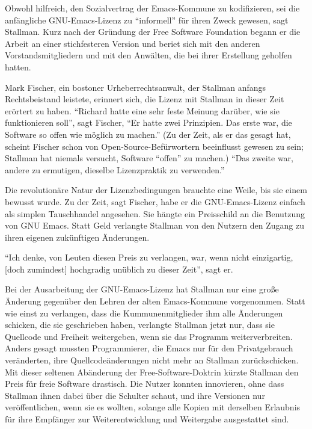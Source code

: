 Obwohl hilfreich, den Sozialvertrag der Emacs-Kommune zu kodifizieren, sei die anfängliche GNU-Emacs-Lizenz zu "`informell"' für ihren Zweck gewesen, sagt Stallman. Kurz nach der Gründung der Free Software Foundation begann er die Arbeit an einer stichfesteren Version und beriet sich mit den anderen Vorstandsmitgliedern und mit den Anwälten, die bei ihrer Erstellung geholfen hatten.

Mark Fischer, ein bostoner Urheberrechtsanwalt, der Stallman anfangs Rechtsbeistand leistete, erinnert sich, die Lizenz mit Stallman in dieser Zeit erörtert zu haben. "`Richard hatte eine sehr feste Meinung darüber, wie sie funktionieren soll"', sagt Fischer, "`Er hatte zwei Prinzipien. Das erste war, die Software so offen wie möglich zu machen."' (Zu der Zeit, als er das gesagt hat, scheint Fischer schon von Open-Source-Befürwortern beeinflusst gewesen zu sein; Stallman hat niemals versucht, Software "`offen"' zu machen.) "`Das zweite war, andere zu ermutigen, dieselbe Lizenzpraktik zu verwenden."' 

Die revolutionäre Natur der Lizenzbedingungen brauchte eine Weile, bis sie einem bewusst wurde. Zu der Zeit, sagt Fischer, habe er die GNU-Emacs-Lizenz einfach als simplen Tauschhandel angesehen. Sie hängte ein Preisschild an die Benutzung von GNU Emacs. Statt Geld verlangte Stallman von den Nutzern den Zugang zu ihren eigenen zukünftigen Änderungen.

"`Ich denke, von Leuten diesen Preis zu verlangen, war, wenn nicht einzigartig, [doch zumindest] hochgradig unüblich zu dieser Zeit"', sagt er.

Bei der Ausarbeitung der GNU-Emacs-Lizenz hat Stallman nur eine große Änderung gegenüber den Lehren der alten Emacs-Kommune vorgenommen. Statt wie einst zu verlangen, dass die Kummunenmitglieder ihm alle Änderungen schicken, die sie geschrieben haben, verlangte Stallman jetzt nur, dass sie Quellcode und Freiheit weitergeben, wenn sie das Programm weiterverbreiten. Anders gesagt mussten Programmierer, die Emacs nur für den Privatgebrauch veränderten, ihre Quellcodeänderungen nicht mehr an Stallman zurückschicken. Mit dieser seltenen Abänderung der Free-Software-Doktrin kürzte Stallman den Preis für freie Software drastisch. Die Nutzer konnten innovieren, ohne dass Stallman ihnen dabei über die Schulter schaut, und ihre Versionen nur veröffentlichen, wenn sie es wollten, solange alle Kopien mit derselben Erlaubnis für ihre Empfänger zur Weiterentwicklung und Weitergabe ausgestattet sind.


